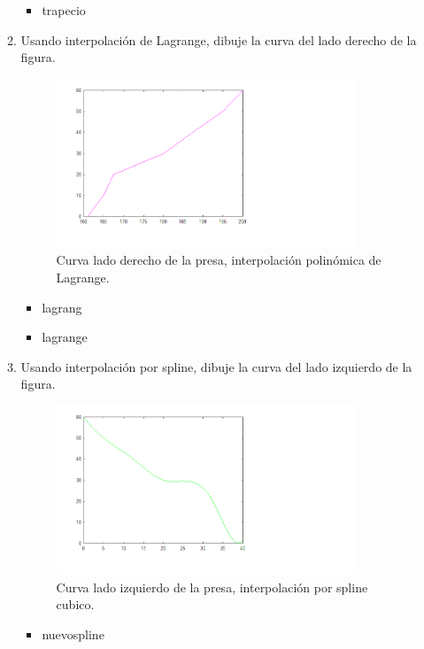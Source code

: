 \documentclass{udpreport}
\begin{document}
\begin{enumerate}
\begin{enumerate}
\begin{itemize}
\item trapecio
\end{itemize}

 \vspace{0.8cm}
 
 \item Usando interpolación de Lagrange, dibuje la curva del lado derecho de la  figura.
 
  \begin{figure}[H]
    \centering
    \includegraphics[width=9cm]{curva_derecha_lagrange}
    \caption{Curva lado derecho de la presa, interpolación polinómica de Lagrange.} \label{fig:curva_derecha_lagrange}
  
\end{figure}
\begin{itemize}
\item lagrang
\item lagrange
\end{itemize}
\newpage
 \item Usando interpolación por spline, dibuje la curva del lado izquierdo de la  figura.
 \\
 \begin{figure}[H]
    \centering
    \includegraphics[width=9cm]{curvaizq_spline}
    \caption{Curva lado izquierdo de la presa, interpolación por spline cubico.} \label{fig:curvaizq_spline}
\end{figure}
\begin{itemize}
\item nuevospline
\end{itemize}
 \end{enumerate}
 \end{enumerate}
\end{document}
